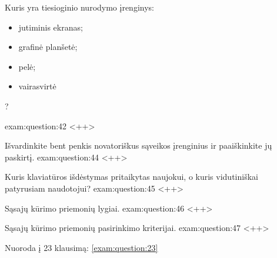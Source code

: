 \begin{question}{%
  Kuris yra tiesioginio nurodymo įrenginys:
  \begin{itemize}
    \item jutiminis ekranas;
    \item grafinė planšetė;
    \item pelė;
    \item vairasvirtė
  \end{itemize}
  ?
  }{exam:question:42}
  <++>
\end{question}

\begin{question}{%
  Išvardinkite bent penkis novatoriškus sąveikos įrenginius ir
  paaiškinkite jų paskirtį.
  }{exam:question:44}
  <++>
\end{question}

\begin{question}{%
  Kuris klaviatūros išdėstymas pritaikytas naujokui, o kuris vidutiniškai
  patyrusiam naudotojui?
  }{exam:question:45}
  <++>
\end{question}

\begin{question}{%
  Sąsajų kūrimo priemonių lygiai.
  }{exam:question:46}
  <++>
\end{question}

\begin{question}{%
  Sąsajų kūrimo priemonių pasirinkimo kriterijai.
  }{exam:question:47}
  <++>
\end{question}

Nuoroda į 23 klausimą: \ref{exam:question:23}
